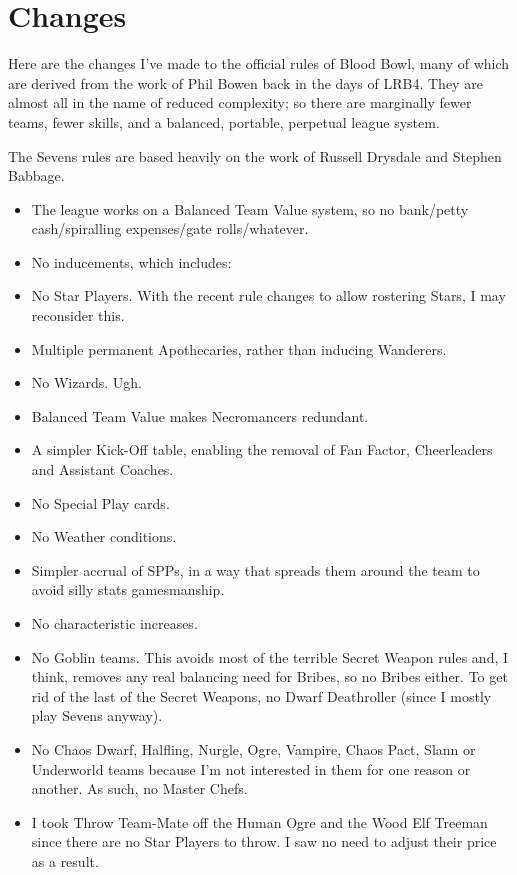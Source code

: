 \documentclass{article}
\begin{document}
\section{Changes}

\begin{multicols}{2}

\par Here are the changes I've made to the official rules of Blood Bowl, many of which are derived from the work of Phil Bowen back in the days of LRB4. They are almost all in the name of reduced complexity; so there are marginally fewer teams, fewer skills, and a balanced, portable, perpetual league system.
\par The Sevens rules are based heavily on the work of Russell Drysdale and Stephen Babbage.

\begin{itemize}
\item The league works on a Balanced Team Value system, so no bank/petty cash/spiralling expenses/gate rolls/whatever.
\item No inducements, which includes:
\item No Star Players. With the recent rule changes to allow rostering Stars, I may reconsider this.
\item Multiple permanent Apothecaries, rather than inducing Wanderers.
\item No Wizards. Ugh.
\item Balanced Team Value makes Necromancers redundant.
\item A simpler Kick-Off table, enabling the removal of Fan Factor, Cheerleaders and Assistant Coaches.
\item No Special Play cards.
\item No Weather conditions.
\item Simpler accrual of SPPs, in a way that spreads them around the team to avoid silly stats gamesmanship.
\item No characteristic increases.
\item No Goblin teams. This avoids most of the terrible Secret Weapon rules and, I think, removes any real balancing need for Bribes, so no Bribes either. To get rid of the last of the Secret Weapons, no Dwarf Deathroller (since I mostly play Sevens anyway).
\item No Chaos Dwarf, Halfling, Nurgle, Ogre, Vampire, Chaos Pact, Slann or Underworld teams because I'm not interested in them for one reason or another. As such, no Master Chefs.
\item I took Throw Team-Mate off the Human Ogre and the Wood Elf Treeman since there are no Star Players to throw. I saw no need to adjust their price as a result.

\end{itemize}
\end{multicols}
\end{document}
